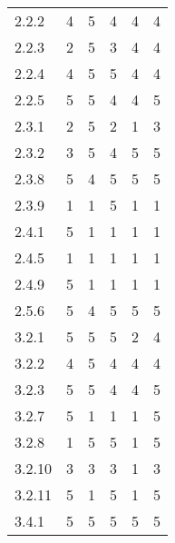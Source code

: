 \begin{longtable}[]{|p{1.5cm}p{2.25cm}p{2.25cm}p{2.25cm}p{2.25cm}p{2cm}|}
2.2.2 & 4 & 5 & 4 & 4 & 4 \\
2.2.3 & 2 & 5 & 3 & 4 & 4 \\
2.2.4 & 4 & 5 & 5 & 4 & 4 \\
2.2.5 & 5 & 5 & 4 & 4 & 5 \\
2.3.1 & 2 & 5 & 2 & 1 & 3 \\
2.3.2 & 3 & 5 & 4 & 5 & 5 \\
2.3.8 & 5 & 4 & 5 & 5 & 5 \\
2.3.9 & 1 & 1 & 5 & 1 & 1 \\
2.4.1 & 5 & 1 & 1 & 1 & 1 \\
2.4.5 & 1 & 1 & 1 & 1 & 1 \\
2.4.9 & 5 & 1 & 1 & 1 & 1 \\
2.5.6 & 5 & 4 & 5 & 5 & 5 \\
3.2.1 & 5 & 5 & 5 & 2 & 4 \\
3.2.2 & 4 & 5 & 4 & 4 & 4 \\
3.2.3 & 5 & 5 & 4 & 4 & 5 \\
3.2.7 & 5 & 1 & 1 & 1 & 5 \\
3.2.8 & 1 & 5 & 5 & 1 & 5 \\
3.2.10 & 3 & 3 & 3 & 1 & 3 \\
3.2.11 & 5 & 1 & 5 & 1 & 5 \\
3.4.1 & 5 & 5 & 5 & 5 & 5 \\
\bottomrule
\end{longtable}
